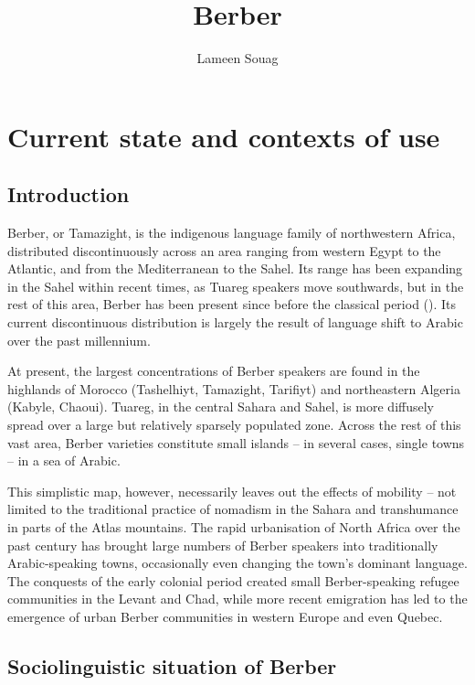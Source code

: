 \documentclass[output=paper]{langsci/langscibook}
\author{Lameen Souag\affiliation{CNRS, Lacito}}
\title{Berber}
\begin{document}
\maketitle 
  


 \section{Current state and contexts of use}


 \subsection{Introduction}


Berber, or Tamazight, is the indigenous language family of northwestern Africa, distributed discontinuously across an area ranging from western Egypt to the Atlantic, and from the Mediterranean to the Sahel. Its range has been expanding in the Sahel within recent times, as Tuareg speakers move southwards, but in the rest of this area, Berber has been present since before the classical period (\citealt{MúrciaSánchez2010}). Its current discontinuous distribution is largely the result of language shift to Arabic over the past millennium.

At present, the largest concentrations of Berber speakers are found in the highlands of Morocco (Tashelhiyt, Tamazight, Tarifiyt) and northeastern Algeria (Kabyle, Chaoui). Tuareg, in the central Sahara and Sahel, is more diffusely spread over a large but relatively sparsely populated zone. Across the rest of this vast area, Berber varieties constitute small islands – in several cases, single towns – in a sea of Arabic.

This simplistic map, however, necessarily leaves out the effects of mobility – not limited to the traditional practice of nomadism in the Sahara and transhumance in parts of the Atlas mountains. The rapid urbanisation of North Africa over the past century has brought large numbers of Berber speakers into traditionally Arabic-speaking towns, occasionally even changing the town's dominant language. The conquests of the early colonial period created small Berber-speaking refugee communities in the Levant and Chad, while more recent emigration has led to the emergence of urban Berber communities in western Europe and even Quebec.


 
 \subsection{Sociolinguistic situation of Berber}
\end{document}

